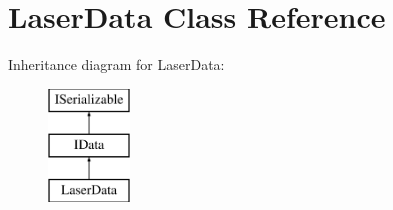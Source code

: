 \hypertarget{class_laser_data}{}\section{Laser\+Data Class Reference}
\label{class_laser_data}
Inheritance diagram for Laser\+Data\+:\begin{figure}[H]
\begin{center}
\leavevmode
\includegraphics[height=3.000000cm]{class_laser_data}
\end{center}
\end{figure}
